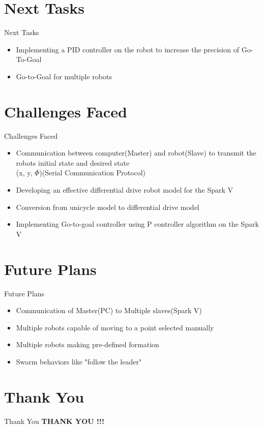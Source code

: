 \documentclass[11pt, a4paper]{beamer}
\begin{document}

\section{Next Tasks}
\begin{frame}{Next Tasks}
\begin{itemize}
	\item Implementing a PID controller on the robot to increase the precision of Go-To-Goal	
	\item Go-to-Goal for multiple robots
	
\end{itemize}	
\end{frame}

\section{Challenges Faced}
\begin{frame}{Challenges Faced}
	\begin{itemize}
		\item Communication between computer(Master) and robot(Slave) to transmit the robots initial state and desired state\\ (x, y, $\Phi$)(Serial Communication Protocol)
		\item Developing an effective differential drive robot  model for the Spark V
		\item Conversion from unicycle model to differential drive model
		\item Implementing  Go-to-goal controller using P controller algorithm on the Spark V
	\end{itemize}
\end{frame}

\section{Future Plans}
\begin{frame}{Future Plans}
	\begin{itemize}
	\item Communication of Master(PC) to Multiple slaves(Spark V)
		\item Multiple robots capable of moving to a point selected manually
		\item Multiple robots making pre-defined formation
		\item Swarm behaviors like "follow the leader"
	\end{itemize}
\end{frame}


\section{Thank You}
\begin{frame}{Thank You}
	\centering \textbf{THANK YOU !!!}
\end{frame}
\end{document}
